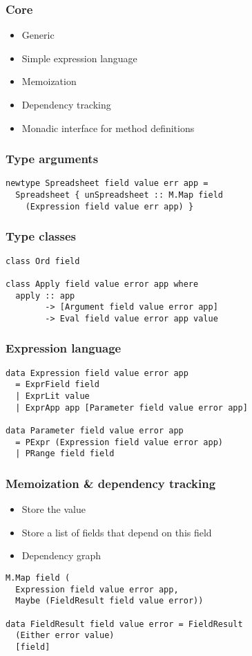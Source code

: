 \documentclass{beamer}
\begin{document}
\begin{frame}
\frametitle{Core}
\begin{itemize}
	\item Generic
	\item Simple expression language
	\item Memoization
	\item Dependency tracking
	\item Monadic interface for method definitions
\end{itemize}
\end{frame}

\begin{frame}[fragile]
\frametitle{Type arguments}
\begin{verbatim}
newtype Spreadsheet field value err app =
  Spreadsheet { unSpreadsheet :: M.Map field
    (Expression field value err app) }
\end{verbatim}
\end{frame}

\begin{frame}[fragile]
\frametitle{Type classes}
\begin{verbatim}
class Ord field

class Apply field value error app where
  apply :: app
        -> [Argument field value error app]
        -> Eval field value error app value

\end{verbatim}
\end{frame}

\begin{frame}[fragile]
\frametitle{Expression language}
\begin{verbatim}
data Expression field value error app
  = ExprField field
  | ExprLit value
  | ExprApp app [Parameter field value error app]

data Parameter field value error app
  = PExpr (Expression field value error app)
  | PRange field field
\end{verbatim}
\end{frame}

\begin{frame}[fragile]
\frametitle{Memoization \& dependency tracking}
\begin{itemize}
	\item Store the value
	\item Store a list of fields that depend on this field
	\item Dependency graph
\end{itemize}

\begin{verbatim}
M.Map field (
  Expression field value error app,
  Maybe (FieldResult field value error))

data FieldResult field value error = FieldResult
  (Either error value)
  [field]
\end{verbatim}
\end{frame}
\end{document}
